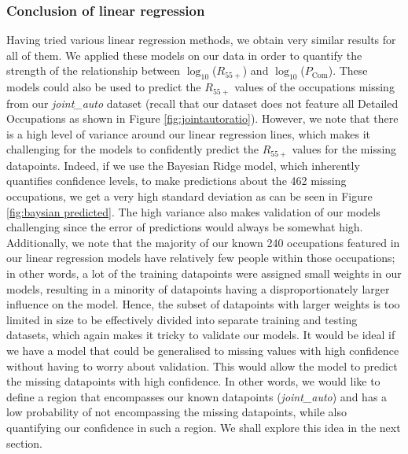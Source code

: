 \documentclass[11pt]{article}
\begin{document}
\subsubsection*{Conclusion of linear regression}
Having tried various linear regression methods, we obtain very similar results for all of them. We applied these models on our data in order to quantify the strength of the relationship between $\log_{10}$($R_{55+}$) and $\log_{10}$($P_{\text{Com}}$). These models could also be used to predict the $R_{55+}$ values of the occupations missing from our \emph{joint\_auto} dataset (recall that our dataset does not feature all Detailed Occupations as shown in Figure \ref{fig:jointautoratio}). However, we note that there is a high level of variance around our linear regression lines, which makes it challenging for the models to confidently predict the $R_{55+}$ values for the missing datapoints. Indeed, if we use the Bayesian Ridge model, which inherently quantifies confidence levels, to make predictions about the 462 missing occupations, we get a very high standard deviation as can be seen in Figure \ref{fig:baysian predicted}. The high variance also makes validation of our models challenging since the error of predictions would always be somewhat high. Additionally, we note that the majority of our known 240 occupations featured in our linear regression models have relatively few people within those occupations; in other words, a lot of the training datapoints were assigned small weights in our models, resulting in a minority of datapoints having a disproportionately larger influence on the model. Hence, the subset of datapoints with larger weights is too limited in size to be effectively divided into separate training and testing datasets, which again makes it tricky to validate our models. It would be ideal if we have a model that could be generalised to missing values with high confidence without having to worry about validation. This would allow the model to predict the missing datapoints with high confidence. In other words, we would like to define a region that encompasses our known datapoints (\emph{joint\_auto}) and has a low probability of not encompassing the missing datapoints, while also quantifying our confidence in such a region. We shall explore this idea in the next section.
\end{document}
